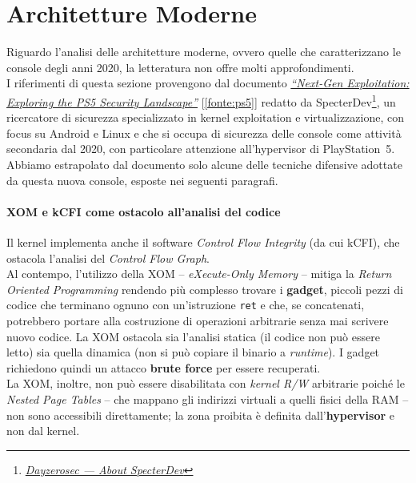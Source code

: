 \section{Architetture Moderne}
Riguardo l'analisi delle architetture moderne, ovvero quelle che caratterizzano le console degli anni 2020, la letteratura non offre molti approfondimenti.\\
I riferimenti di questa sezione provengono dal documento \hyperref[fonte:ps5]{\emph{``Next-Gen Exploitation: Exploring the PS5 Security Landscape''}} [\ref{fonte:ps5}] 
redatto da SpecterDev\footnote{\href{https://dayzerosec.com/}{\textit{Dayzerosec — About SpecterDev}}
}, un ricercatore di sicurezza specializzato in kernel exploitation e virtualizzazione, con focus su Android e Linux e che si occupa di sicurezza delle console come attività secondaria dal 2020, 
con particolare attenzione all'hypervisor di PlayStation~5.\\
Abbiamo estrapolato dal documento solo alcune delle tecniche difensive adottate da questa nuova console, esposte nei seguenti paragrafi.

\paragraph{XOM e kCFI come ostacolo all'analisi del codice}
Il kernel implementa anche il software \textit{Control Flow Integrity} (da cui kCFI), che ostacola l'analisi del \textit{Control Flow Graph}.\\
Al contempo, l'utilizzo della XOM -- \textit{eXecute-Only Memory} -- mitiga la \textit{Return Oriented Programming} rendendo più complesso trovare i \textbf{gadget}, piccoli pezzi di codice che terminano ognuno con un'istruzione \texttt{ret} e che, 
se concatenati, potrebbero portare alla costruzione di operazioni arbitrarie senza mai scrivere nuovo codice. La XOM ostacola sia l'analisi statica (il codice non può essere letto) sia quella dinamica (non si può copiare il binario a \textit{runtime}).
I gadget richiedono quindi un attacco \textbf{brute force} per essere recuperati.\\
La XOM, inoltre, non può essere disabilitata con \textit{kernel R/W} arbitrarie poiché le \textit{Nested Page Tables} -- che mappano gli indirizzi virtuali a quelli fisici della RAM -- non sono accessibili direttamente; la zona proibita è definita dall'\textbf{hypervisor} e non dal kernel.

